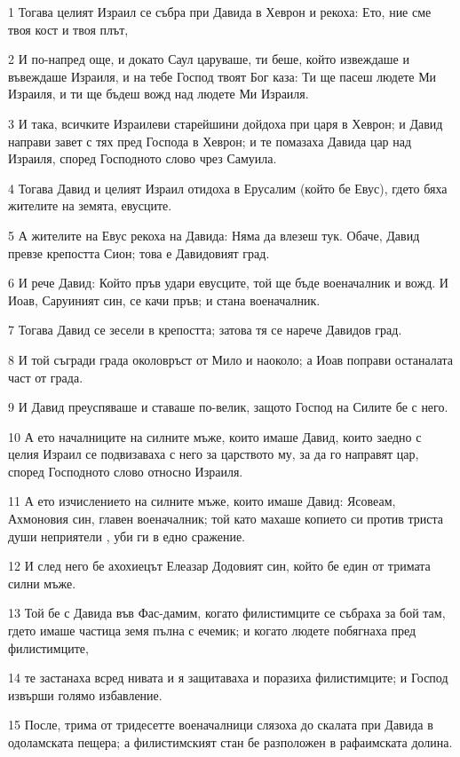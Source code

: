 \par 1 Тогава целият Израил се събра при Давида в Хеврон и рекоха: Ето, ние сме твоя кост и твоя плът,
\par 2 И по-напред още, и докато Саул царуваше, ти беше, който извеждаше и въвеждаше Израиля, и на тебе Господ твоят Бог каза: Ти ще пасеш людете Ми Израиля, и ти ще бъдеш вожд над людете Ми Израиля.
\par 3 И така, всичките Израилеви старейшини дойдоха при царя в Хеврон; и Давид направи завет с тях пред Господа в Хеврон; и те помазаха Давида цар над Израиля, според Господното слово чрез Самуила.
\par 4 Тогава Давид и целият Израил отидоха в Ерусалим (който бе Евус), гдето бяха жителите на земята, евусците.
\par 5 А жителите на Евус рекоха на Давида: Няма да влезеш тук. Обаче, Давид превзе крепостта Сион; това е Давидовият град.
\par 6 И рече Давид: Който пръв удари евусците, той ще бъде военачалник и вожд. И Иоав, Саруиният син, се качи пръв; и стана военачалник.
\par 7 Тогава Давид се зесели в крепостта; затова тя се нарече Давидов град.
\par 8 И той съгради града околовръст от Мило и наоколо; а Иоав поправи останалата част от града.
\par 9 И Давид преуспяваше и ставаше по-велик, защото Господ на Силите бе с него.
\par 10 А ето началниците на силните мъже, които имаше Давид, които заедно с целия Израил се подвизаваха с него за царството му, за да го направят цар, според Господното слово относно Израиля.
\par 11 А ето изчислението на силните мъже, които имаше Давид: Ясовеам, Ахмоновия син, главен военачалник; той като махаше копието си против триста души неприятели , уби ги в едно сражение.
\par 12 И след него бе ахохиецът Елеазар Додовият син, който бе един от тримата силни мъже.
\par 13 Той бе с Давида във Фас-дамим, когато филистимците се събраха за бой там, гдето имаше частица земя пълна с ечемик; и когато людете побягнаха пред филистимците,
\par 14 те застанаха всред нивата и я защитаваха и поразиха филистимците; и Господ извърши голямо избавление.
\par 15 После, трима от тридесетте военачалници слязоха до скалата при Давида в одоламската пещера; а филистимският стан бе разположен в рафаимската долина.
